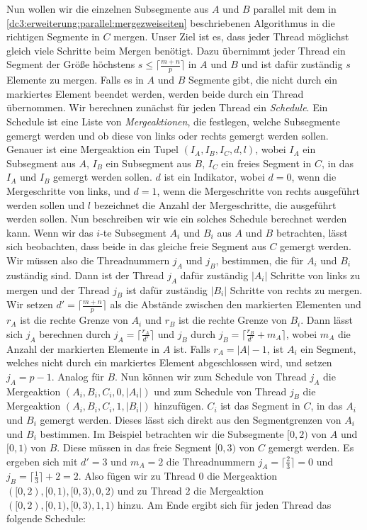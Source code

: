 Nun wollen wir die einzelnen Subsegmente aus $A$ und $B$ parallel mit dem in \cref{dc3:erweiterung:parallel:mergezweiseiten} beschriebenen Algorithmus in die richtigen Segmente in $C$ mergen. Unser Ziel ist es, dass jeder Thread möglichst gleich viele Schritte beim Mergen benötigt. Dazu übernimmt jeder Thread ein Segment der Größe höchstens $s \le \lceil \frac{m+n}{p} \rceil$ in $A$ und $B$ und ist dafür zuständig $s$ Elemente zu mergen. Falls es in $A$ und $B$ Segmente gibt, die nicht durch ein markiertes Element beendet werden, werden beide durch ein Thread übernommen.
Wir berechnen zunächst für jeden Thread ein \textit{Schedule}. Ein Schedule ist eine Liste von \textit{Mergeaktionen}, die festlegen, welche Subsegmente gemergt werden und ob diese von links oder rechts gemergt werden sollen. Genauer ist eine Mergeaktion ein Tupel $(I_A, I_B, I_C, d, l)$, wobei $I_A$ ein Subsegment aus $A$, $I_B$ ein Subsegment aus $B$, $I_C$ ein freies Segment in $C$, in das $I_A$ und $I_B$ gemergt werden sollen. $d$ ist ein Indikator, wobei $d = 0$, wenn die Mergeschritte von links, und $d = 1$, wenn die Mergeschritte von rechts ausgeführt werden sollen und $l$ bezeichnet die Anzahl der Mergeschritte, die ausgeführt werden sollen.
Nun beschreiben wir wie ein solches Schedule berechnet werden kann. Wenn wir das $i$-te Subsegment $A_i$ und $B_i$ aus $A$ und $B$ betrachten, lässt sich beobachten, dass beide in das gleiche freie Segment aus $C$ gemergt werden. Wir müssen also die Threadnummern $j_A$ und $j_B$, bestimmen, die für $A_i$ und $B_i$ zuständig sind. Dann ist der Thread $j_A$ dafür zuständig $|A_i|$ Schritte von links zu mergen und der Thread $j_B$ ist dafür zuständig $|B_i|$ Schritte von rechts zu mergen. Wir setzen $d' = \lceil \frac{m+n}{p} \rceil$ als die Abstände zwischen den markierten Elementen und $r_A$ ist die rechte Grenze von $A_i$ und $r_B$ ist die rechte Grenze von $B_i$. Dann lässt sich $j_A$ berechnen durch $j_A = \lceil \frac{r_A}{d'} \rceil$ und $j_B$ durch $j_B = \lceil \frac{r_B}{d'}+m_A \rceil$, wobei $m_A$ die Anzahl der markierten Elemente in $A$ ist. Falls $r_A = |A|-1$, ist $A_i$ ein Segment, welches nicht durch ein markiertes Element abgeschlossen wird, und setzen $j_A = p-1$. Analog für $B$. 
Nun können wir zum Schedule von Thread $j_A$ die Mergeaktion $(A_i, B_i, C_i, 0, |A_i|)$ und zum Schedule von Thread $j_B$ die Mergeaktion $(A_i, B_i, C_i, 1, |B_i|)$ hinzufügen. $C_i$ ist das Segment in $C$, in das $A_i$ und $B_i$ gemergt werden. Dieses lässt sich direkt aus den Segmentgrenzen von $A_i$ und $B_i$ bestimmen.
Im Beispiel betrachten wir die Subsegmente $[0,2)$ von $A$ und $[0,1)$ von $B$. Diese müssen in das freie Segment $[0,3)$ von $C$ gemergt werden. Es ergeben sich mit $d' = 3$ und $m_A = 2$ die Threadnummern $j_A = \lceil \frac{2}{3} \rceil = 0$ und $j_B = \lceil \frac{1}{3} \rceil + 2 = 2$. Also fügen wir zu Thread $0$ die Mergeaktion $([0,2), [0,1), [0,3), 0, 2)$ und zu Thread $2$ die Mergeaktion $([0,2), [0,1), [0,3), 1, 1)$ hinzu. Am Ende ergibt sich für jeden Thread das folgende Schedule:
